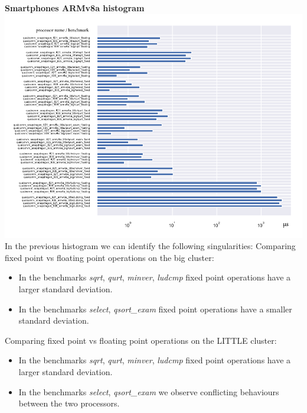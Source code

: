 \clearpage
\textbf{Smartphones ARMv8a histogram}\newline
\hspace*{-3.2cm}
\includegraphics[width=570pt]{smartphones_histogram.pdf}
\clearpage
In the previous histogram we can identify the following singularities:
Comparing fixed point vs floating point operations on the big cluster:
\begin{itemize}
		\item In the benchmarks \textit{sqrt}, \textit{qurt}, \textit{minver}, \textit{ludcmp} fixed point operations have a larger standard deviation.
		\item In the benchmarks \textit{select}, \textit{qsort\_exam} fixed point operations have a smaller standard deviation.
\end{itemize}
Comparing fixed point vs floating point operations on the LITTLE cluster:
\begin{itemize}
		\item In the benchmarks \textit{sqrt}, \textit{qurt}, \textit{minver}, \textit{ludcmp} fixed point operations have a larger standard deviation.
		\item In the benchmarks \textit{select}, \textit{qsort\_exam} we observe conflicting behaviours between the two processors.
\end{itemize}

